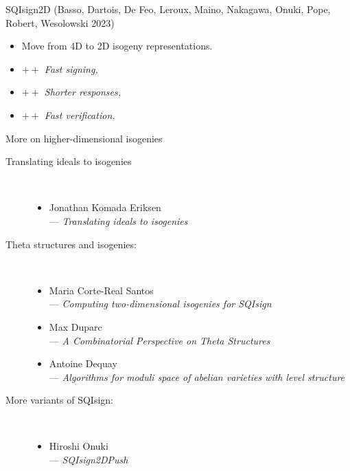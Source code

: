 \documentclass[aspectratio=169]{beamer}
\begin{document}

\begin{frame}{SQIsign2D {\footnotesize(Basso, Dartois, De Feo, Leroux, Maino, Nakagawa, Onuki, Pope, Robert, Wesolowski 2023)}}
  \begin{itemize}
    \setlength{\itemsep}{2em}
  \item Move from 4D to 2D isogeny representations.
  \item \emph{$++$ Fast signing,}
  \item \emph{$++$ Shorter responses,}
  \item \emph{$++$ Fast verification.}
  \end{itemize}
\end{frame}


\begin{frame}{More on higher-dimensional isogenies}
  \begin{description}
  \item[Translating ideals to isogenies]\
    \begin{itemize}
    \item Jonathan Komada Eriksen\\
      --- \textit{Translating ideals to isogenies}
    \end{itemize}
  \item[Theta structures and isogenies:]\
    \begin{itemize}
    \item Maria Corte-Real Santos\\
      --- \textit{Computing two-dimensional isogenies for SQIsign}
    \item Max Duparc\\
      --- \textit{A Combinatorial Perspective on Theta Structures}
    \item Antoine Dequay\\
      --- \textit{Algorithms for moduli space of abelian varieties with level structure}
    \end{itemize}
  \item[More variants of SQIsign:]\
    \begin{itemize}
    \item Hiroshi Onuki\\
      --- \textit{SQIsign2DPush}
    \end{itemize}
  \end{description}
\end{frame}

\end{document}
